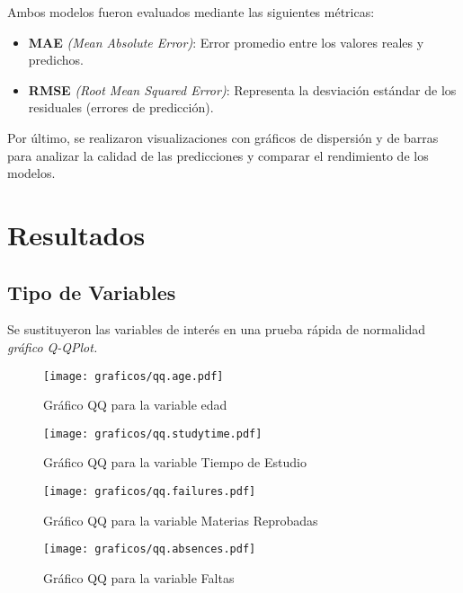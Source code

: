 \documentclass{article}
\begin{document}
\begin{enumerate}
Ambos modelos fueron evaluados mediante las siguientes métricas:

\begin{itemize}[label=\textendash]
\item \textbf{MAE} \textit{(Mean Absolute Error)}: Error promedio entre los valores reales y predichos.

\item \textbf{RMSE} \textit{(Root Mean Squared Error)}: Representa la desviación estándar de los residuales (errores de predicción).
\end{itemize}

Por último, se realizaron visualizaciones con gráficos de dispersión y de barras para analizar la calidad de las predicciones y comparar el rendimiento de los modelos.

\end{enumerate}


\section{Resultados}

\subsection*{Tipo de Variables}
Se sustituyeron las variables de interés en una prueba rápida de normalidad \textit{gráfico Q-QPlot.} 

\begin{figure}[h]
    \centering
    \begin{minipage}[b]{0.45\textwidth}
        \texttt{[image: graficos/qq.age.pdf]}
        \caption{\centering \small Gráfico QQ para la variable edad}
        \label{fig:gra1}
    \end{minipage}
    \hspace{0.05\textwidth}
    \begin{minipage}[b]{0.45\textwidth}
        \texttt{[image: graficos/qq.studytime.pdf]}
        \caption{\centering \small Gráfico QQ para la variable Tiempo de Estudio}
        \label{fig:gra2}
    \end{minipage}
\end{figure}

\begin{figure}[h]
    \centering
    \begin{minipage}[b]{0.45\textwidth}
        \texttt{[image: graficos/qq.failures.pdf]}
        \caption{\centering \small Gráfico QQ para la variable Materias Reprobadas}
        \label{fig:gra3}
    \end{minipage}
    \hspace{0.05\textwidth}
    \begin{minipage}[b]{0.45\textwidth}
        \texttt{[image: graficos/qq.absences.pdf]}
        \caption{\centering \small Gráfico QQ para la variable Faltas}
        \label{fig:gra4}
    \end{minipage}
\end{figure}
\end{document}
